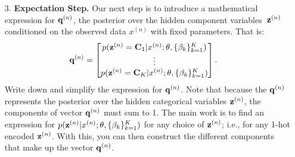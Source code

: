 \documentclass[submit]{../harvardml}
\begin{document}
\begin{problem}
\begin{enumerate}
    \item[3.] \textbf{Expectation Step.} Our next step is to introduce a
    mathematical expression for $\mathbf{q}^{(n)}$, the posterior over the
    hidden component variables~$\mathbf{z}^{(n)}$ conditioned on the observed data $x^{(n)}$ with fixed parameters. That is:
    \begin{align*}
      \textbf{q}^{(n)} &= \begin{bmatrix}
        p(\mathbf{z}^{(n)} =\mathbf{C}_1| x^{(n)}; \mathbf{\theta}, \{ \beta_k \}^K_{k=1}) \\
        \vdots \\
        p(\mathbf{z}^{(n)} =\mathbf{C}_K| x^{(n)}; \mathbf{\theta}, \{ \beta_k \}^K_{k=1})
      \end{bmatrix}.
    \end{align*}
    Write down and simplify the expression for $\mathbf{q}^{(n)}$.  Note that because the $\mathbf{q}^{(n)}$ represents the posterior over the hidden categorical variables $\mathbf{z}^{(n)}$, the components of vector $\mathbf{q}^{(n)}$ must sum to 1.
    The main work is to find an expression for $p(\mathbf{z}^{(n)}|x^{(n)}; \mathbf{\theta}, \{\beta_k\}^K_{k=1})$  for any choice of $\mathbf{z}^{(n)}$; i.e., for any 1-hot encoded $\mathbf{z}^{(n)}$. With this, you can then construct the different components that make up the vector $\mathbf{q}^{(n)}$.
  \end{enumerate}
\end{problem}

\newpage
\end{document}
